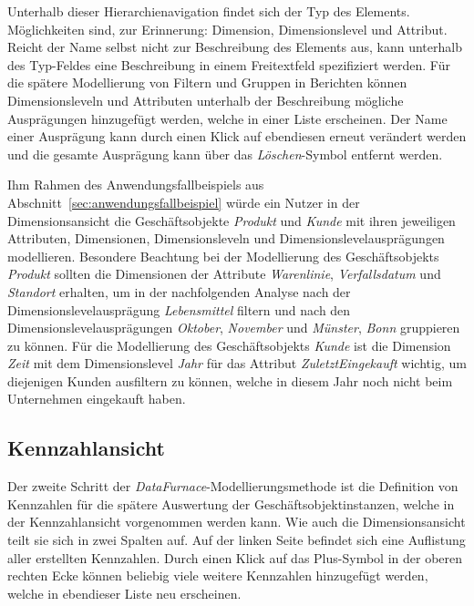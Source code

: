 \documentclass[
  language=german, %
  type=bachelor,%
  ngerman
]{isthesis}
\begin{document}
\begin{content}
  Unterhalb dieser Hierarchienavigation findet sich der Typ des Elements.
  Möglichkeiten sind, zur Erinnerung: Dimension, Dimensionslevel und Attribut.
  Reicht der Name selbst nicht zur Beschreibung des Elements aus, kann
  unterhalb des Typ-Feldes eine Beschreibung in einem Freitextfeld spezifiziert
  werden. Für die spätere Modellierung von Filtern und Gruppen in Berichten
  können Dimensionsleveln und Attributen unterhalb der Beschreibung mögliche
  Ausprägungen hinzugefügt werden, welche in einer Liste erscheinen. Der Name
  einer Ausprägung kann durch einen Klick auf ebendiesen erneut verändert
  werden und die gesamte Ausprägung kann über das
  \textit{Löschen}-Symbol entfernt werden.

  Ihm Rahmen des Anwendungsfallbeispiels aus
  Abschnitt~\ref{sec:anwendungsfallbeispiel} würde ein Nutzer in der
  Dimensionsansicht die Geschäftsobjekte \textit{Produkt} und \textit{Kunde}
  mit ihren jeweiligen Attributen, Dimensionen, Dimensionsleveln und
  Dimensionslevelausprägungen modellieren. Besondere Beachtung bei der
  Modellierung des Geschäftsobjekts \textit{Produkt} sollten die Dimensionen
  der Attribute \textit{Warenlinie}, \textit{Verfallsdatum} und
  \textit{Standort} erhalten, um in der nachfolgenden Analyse nach der
  Dimensionslevelausprägung \textit{Lebensmittel} filtern und nach den
  Dimensionslevelausprägungen \textit{Oktober}, \textit{November} und
  \textit{Münster}, \textit{Bonn} gruppieren zu können. Für die Modellierung
  des Geschäftsobjekts \textit{Kunde} ist die Dimension \textit{Zeit} mit dem
  Dimensionslevel \textit{Jahr} für das Attribut \textit{ZuletztEingekauft}
  wichtig, um diejenigen Kunden ausfiltern zu können, welche in diesem Jahr
  noch nicht beim Unternehmen eingekauft haben.


  \subsection{Kennzahlansicht}

  Der zweite Schritt der \textit{DataFurnace}-Modellierungsmethode ist die
  Definition von Kennzahlen für die spätere Auswertung der
  Geschäftsobjektinstanzen, welche in der Kennzahlansicht vorgenommen werden
  kann. Wie auch die Dimensionsansicht teilt sie sich in zwei Spalten auf. Auf
  der linken Seite befindet sich eine Auflistung aller erstellten Kennzahlen.
  Durch einen Klick auf das Plus-Symbol in der oberen rechten Ecke können
  beliebig viele weitere Kennzahlen hinzugefügt werden, welche in ebendieser
  Liste neu erscheinen.


\end{content}
\end{document}
